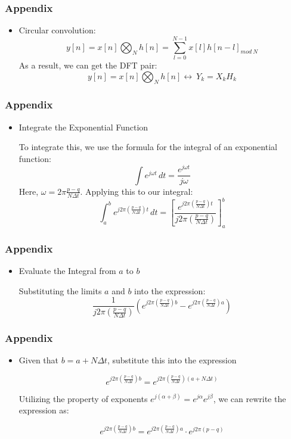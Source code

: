 \documentclass[xcolor=dvipsnames,aspectratio=169]{beamer} %
\begin{document}
\begin{frame}
\frametitle{Appendix}
\begin{itemize}
  \item Circular convolution:
  \[y[n] = x[n]\bigotimes_{N}h[n] = \sum_{l=0}^{N-1}x[l]h[n-l]_{mod\ N}\]
  As a result, we can get the DFT pair:
  \[y[n]=x[n]\bigotimes_{N}h[n] \leftrightarrow\ Y_{k}=X_{k}H_{k}\] 
\end{itemize}
\end{frame}
\begin{frame}
\frametitle{Appendix}
\begin{itemize}
  \item Integrate the Exponential Function
  
  To integrate this, we use the formula for the integral of an exponential function:   
    \[
    \int e^{j\omega t} \, dt = \frac{e^{j\omega t}}{j\omega}
    \]
    Here, \(\omega = 2\pi \frac{p - q}{N\Delta t}\). Applying this to our integral:
    \[
    \int_a^b e^{j2\pi(\frac{p - q}{N\Delta t})t} \, dt = \left[ \frac{e^{j2\pi(\frac{p - q}{N\Delta t})t}}{j2\pi(\frac{p - q}{N\Delta t})} \right]_a^b
    \]
 
\end{itemize}
\end{frame}
\begin{frame}
\frametitle{Appendix}
\begin{itemize}
  \item Evaluate the Integral from \(a\) to \(b\)
  
  Substituting the limits \(a\) and \(b\) into the expression:
    \[
    \frac{1}{j2\pi(\frac{p - q}{N\Delta t})} \left( e^{j2\pi(\frac{p - q}{N\Delta t})b} - e^{j2\pi(\frac{p - q}{N\Delta t})a} \right)
    \]
\end{itemize}
\end{frame}
\begin{frame}
\frametitle{Appendix}
\begin{itemize}
  \item Given that \(b = a + N\Delta t\), substitute this into the expression
  
   \[
    e^{j2\pi \left( \frac{p-q}{N\Delta t} \right) b} = e^{j2\pi \left( \frac{p-q}{N\Delta t} \right) (a + N\Delta t)}
    \]

     Utilizing the property of exponents \(e^{j(\alpha + \beta)} = e^{j\alpha} e^{j\beta}\), we can rewrite the expression as:

     \[
    e^{j2\pi \left( \frac{p-q}{N\Delta t} \right) b} = e^{j2\pi \left( \frac{p-q}{N\Delta t} \right) a} \cdot e^{j2\pi (p-q)}
    \]

\end{itemize}
\end{frame}
\end{document}
